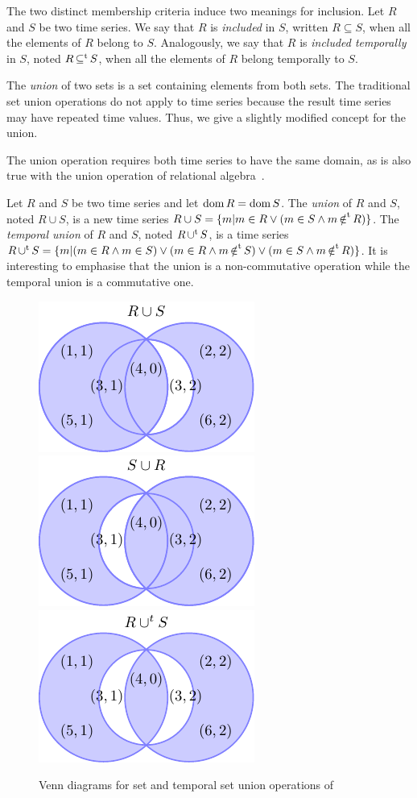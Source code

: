 The two distinct membership criteria induce two meanings for
inclusion. Let $R$ and $S$ be two time series.  We say that $R$ is
\emph{included} in $S$, written $R\subseteq S$, when all the elements
of $R$ belong to $S$.  Analogously, we say that $R$ is \emph{included
  temporally} in $S$, noted $R\operatorname*{\subseteq^t} S$, when all the elements of
$R$ belong temporally to $S$.

The \emph{union} of two sets is a set containing elements from both
sets. The traditional set union operations do not apply to time series
because the result time series may have repeated time values.  Thus,
we give a slightly modified concept for the union.

The union operation requires both time series to have the same domain,
as is also true with the union operation of relational
algebra~\cite{date:introduction}.

Let $R$ and $S$ be two time series and let $\operatorname{dom} R =\operatorname{dom} S$.  The
\emph{union} of $R$ and $S$, noted $R\cup S$, is a new time series $R
\cup S = \{m|m\in R\vee (m\in S\wedge m \operatorname*{\notin^t} R)\}$.  The
\emph{temporal union} of $R$ and $S$, noted $R \operatorname*{\cup^t} S$, is a time
series $R \operatorname*{\cup^t} S = \{ m | (m \in R \wedge m \in S) \vee (m \in R
\wedge m \operatorname*{\notin^t} S) \vee (m \in S \wedge m \operatorname*{\notin^t} R) \}$.  It is
interesting to emphasise that the union is a non-commutative operation
while the temporal union is a commutative one.

\begin{figure}
  \centering
  \includegraphics{fig_model_venn.pdf}
  \includegraphics{fig_model_venn_reverse.pdf}
  \includegraphics{fig_model_venn2.pdf}
  \caption{Venn diagrams for set and temporal set union operations of
    }
  \label{fig:model:venn}
\end{figure}

